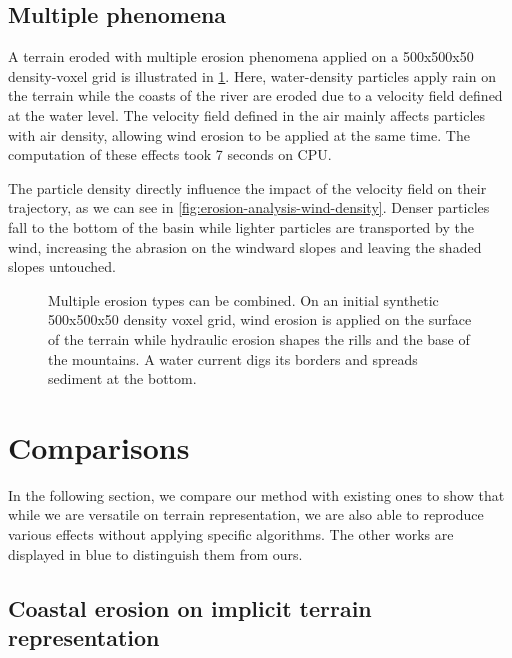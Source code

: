 \subsection{Multiple phenomena} 

A terrain eroded with multiple erosion phenomena applied on a 500x500x50 density-voxel grid is illustrated in \cref{fig:erosion-multiErosions}. Here, water-density particles apply rain on the terrain while the coasts of the river are eroded due to a velocity field defined at the water level. The velocity field defined in the air mainly affects particles with air density, allowing wind erosion to be applied at the same time. The computation of these effects took 7 seconds on CPU. 

The particle density directly influence the impact of the velocity field on their trajectory, as we can see in \cref{fig:erosion-analysis-wind-density}. Denser particles fall to the bottom of the basin while lighter particles are transported by the wind, increasing the abrasion on the windward slopes and leaving the shaded slopes untouched.

\begin{figure}
    \caption[Multiple erosion simulations on a single terrain]{Multiple erosion types can be combined. On an initial synthetic 500x500x50 density voxel grid, wind erosion is applied on the surface of the terrain while hydraulic erosion shapes the rills and the base of the mountains. A water current digs its borders and spreads sediment at the bottom.}
    \label{fig:erosion-multiErosions}
\end{figure}

\section{Comparisons}

In the following section, we compare our method with existing ones to show that while we are versatile on terrain representation, we are also able to reproduce various effects without applying specific algorithms. The other works are displayed in blue to distinguish them from ours.

\subsection{Coastal erosion on implicit terrain representation}

